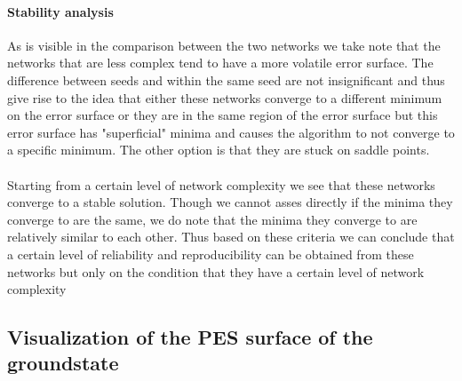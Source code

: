 \documentclass[12pt]{article}
\begin{document}
\paragraph{Stability analysis}
As is visible in the comparison between the two networks we take note that the networks that are less complex tend to have a more volatile error surface. The difference between seeds and within the same seed are not insignificant and thus give rise to the idea that either these networks converge to a different minimum on the error surface or they are in the same region of the error surface but this error surface has "superficial" minima and causes the algorithm to not converge to a specific minimum. The other option is that they are stuck on saddle points.
\\
\\
Starting from a certain level of network complexity we see that these networks converge to a stable solution. Though we cannot asses directly if the minima they converge to are the same, we do note that the minima they converge to are relatively similar to each other. Thus based on these criteria we can conclude that a certain level of reliability and reproducibility can be obtained from these networks but only on the condition that they have a certain level of network complexity 

\subsection{Visualization of the PES surface of the groundstate}
\end{document}

